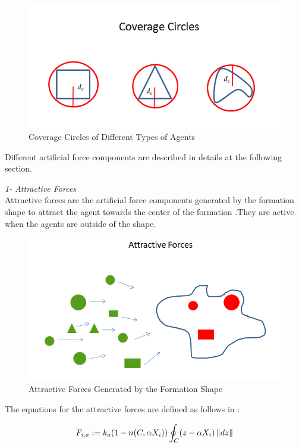 \begin{figure}[H]
\caption{Coverage Circles of Different Types of Agents} \label{coverage_circle_ref}
\centering
\includegraphics[scale = 0.60]{coverage_circles}
\end{figure}
		
Different artificial force components are described in details at the following section. \newline

\textit{			1- Attractive Forces} \\ 
Attractive forces are the artificial force components generated by the formation shape to attract the agent towards the center of the formation .They are active when the agents are outside of the shape. 

\begin{figure}[H]
\caption{Attractive Forces Generated by the Formation Shape}
\centering
\includegraphics[scale = 0.60]{attractive_forces}
\end{figure}	

The equations for the attractive forces are defined as follows in \cite{17}:			

\begin{equation} \label{samitha_attractive}
F_{i,a} := k_a (1-n(C,\alpha X_i)) \oint_C(z-\alpha X_i)\left\lVert dz\right\rVert
\end{equation}

